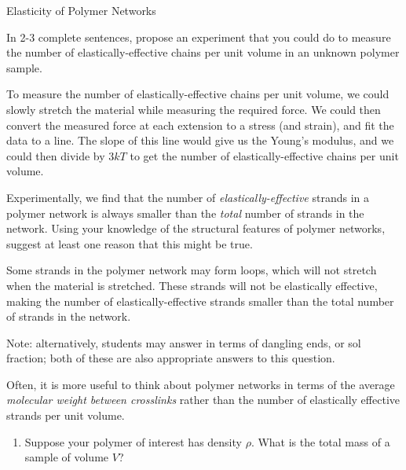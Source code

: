 \begin{activity}{Elasticity of Polymer Networks}
\begin{ctqs}
	\question In 2-3 complete sentences, propose an experiment that you could do to measure the number of elastically-effective chains per unit volume in an unknown polymer sample.
	
		\begin{solution}[1.75in]{}
		
			To measure the number of elastically-effective chains per unit volume, we could slowly stretch the material while measuring the required force.  We could then convert the measured force at each extension to a stress (and strain), and fit the data to a line.  The slope of this line would give us the Young's modulus, and we could then divide by $3kT$ to get the number of elastically-effective chains per unit volume.
		
		\end{solution}
\end{ctqs}


\begin{exercises}

	\exercise Experimentally, we find that the number of \emph{elastically-effective} strands in a polymer network is always smaller than the \emph{total} number of strands in the network.  Using your knowledge of the structural features of polymer networks, suggest at least one reason that this might be true.
	
		\begin{solution}{}
		Some strands in the polymer network may form loops, which will not stretch when the material is stretched.  These strands will not be elastically effective, making the number of elastically-effective strands smaller than the total number of strands in the network.
			
			Note: alternatively, students may answer in terms of dangling ends, or sol fraction; both of these are also appropriate answers to this question.
		\end{solution}
	
	
	
	
	\exercise Often, it is more useful to think about polymer networks in terms of the average \emph{molecular weight between crosslinks} rather than the number of elastically effective strands per unit volume.
	
		\begin{enumerate}
			\item Suppose your polymer of interest has density $\rho$.  What is the total mass of a sample of volume $V$?
			

\end{enumerate}
\end{exercises}
\end{activity}
